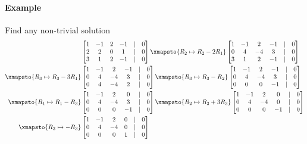 \paragraph*{Example} Find any non-trivial solution
\begin{align*}
    &\begin{bmatrix}
        1 & -1 & 2 & -1 & | & 0 \\
        2 & 2 & 0 & 1 & | & 0 \\
        3 & 1 & 2 & -1 & | & 0
    \end{bmatrix} \xmapsto{R_2 \mapsto R_2 - 2R_1}\begin{bmatrix}
        1 & -1 & 2 & -1 & | & 0 \\
        0 & 4 & -4 & 3 & | & 0 \\
        3 & 1 & 2 & -1 & | & 0
    \end{bmatrix} \\
    \xmapsto{R_3 \mapsto R_3 - 3R_1} &\begin{bmatrix}
        1 & -1 & 2 & -1 & | & 0 \\
        0 & 4 & -4 & 3 & | & 0 \\
        0 & 4 & -4 & 2 & | & 0
    \end{bmatrix} \xmapsto{R_3 \mapsto R_3 - R_2} \begin{bmatrix}
        1 & -1 & 2 & -1 & | & 0 \\
        0 & 4 & -4 & 3 & | & 0 \\
        0 & 0 & 0 & -1 & | & 0
    \end{bmatrix} \\
    \xmapsto{R_1 \mapsto R_1 - R_3} &\begin{bmatrix} 
        1 & -1 & 2 & 0 & | & 0 \\
        0 & 4 & -4 & 3 & | & 0 \\
        0 & 0 & 0 & -1 & | & 0
    \end{bmatrix} \xmapsto{R_2 \mapsto R_2 + 3R_3} \begin{bmatrix}
        1 & -1 & 2 & 0 & | & 0 \\
        0 & 4 & -4 & 0 & | & 0 \\
        0 & 0 & 0 & -1 & | & 0
    \end{bmatrix} \\
    \xmapsto{R_3 \mapsto -R_3} &\begin{bmatrix}
        1 & -1 & 2 & 0 & | & 0 \\
        0 & 4 & -4 & 0 & | & 0 \\
        0 & 0 & 0 & 1 & | & 0

\end{bmatrix}
\end{align*}
